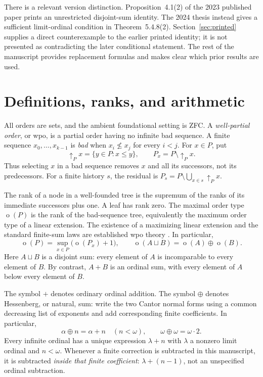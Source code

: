 \documentclass[11pt,a4paper]{article}
\theoremstyle{definition}
\theoremstyle{remark}
\DeclareMathOperator{\mot}{o}
\newcommand{\ds}{\mathbin{\sqcup}}
\begin{document}
There is a relevant version distinction. Proposition~4.1(2) of the 2023
published paper prints an unrestricted disjoint-sum identity. The 2024 thesis
instead gives a sufficient limit-ordinal condition in Theorem~5.4.8(2).
Section~\ref{sec:printed} supplies a direct counterexample to the earlier
printed identity; it is not presented as contradicting the later conditional
statement. The rest of the manuscript provides replacement formulas and
makes clear which prior results are used.

\section{Definitions, ranks, and arithmetic}\label{sec:definitions}

All orders are sets, and the ambient foundational setting is ZFC. A
\emph{well-partial order}, or wpo, is a partial order having no infinite bad
sequence. A finite sequence $x_0,\ldots,x_{k-1}$ is \emph{bad} when
$x_i\not\leq x_j$ for every $i<j$. For $x\in P$, put
\[
\uparrow_P x=\{y\in P:x\leq y\},\qquad
P_x=P\setminus\uparrow_P x.
\]
Thus selecting $x$ in a bad sequence removes $x$ and all its successors,
not its predecessors. For a finite history $s$, the residual is
$P_s=P\setminus\bigcup_{x\in s}\uparrow_Px$.

The rank of a node in a well-founded tree is the supremum of the ranks of
its immediate successors plus one. A leaf has rank zero. The maximal order
type $\mot(P)$ is the rank of the bad-sequence tree, equivalently the maximum
order type of a linear extension. The existence of a maximizing linear
extension and the standard finite-sum laws are established wpo theory
\cite{deJonghParikh1977,DSS2020}. In particular,
\begin{equation}\label{eq:mot-rec}
\mot(P)=\sup_{x\in P}\bigl(\mot(P_x)+1\bigr),\qquad
\mot(A\ds B)=\mot(A)\oplus\mot(B).
\end{equation}
Here $A\ds B$ is a disjoint sum: every element of $A$ is incomparable to
every element of $B$. By contrast, $A+B$ is an ordinal sum, with every
element of $A$ below every element of $B$.

The symbol $+$ denotes ordinary ordinal addition. The symbol $\oplus$
denotes Hessenberg, or natural, sum: write the two Cantor normal forms using
a common decreasing list of exponents and add corresponding finite
coefficients. In particular,
\[
\alpha\oplus n=\alpha+n\quad(n<\omega),\qquad
\omega\oplus\omega=\omega\cdot2.
\]
Every infinite ordinal has a unique expression $\lambda+n$ with $\lambda$
a nonzero limit ordinal and $n<\omega$. Whenever a finite correction is
subtracted in this manuscript, it is subtracted \emph{inside that finite
coefficient}: $\lambda+(n-1)$, not an unspecified ordinal subtraction.
\end{document}
